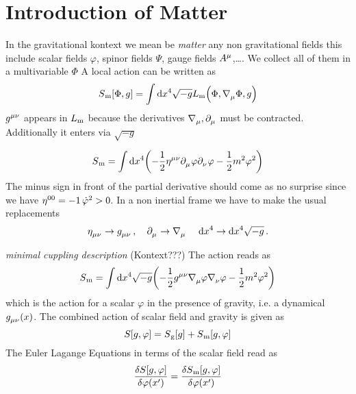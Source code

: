 \section{Introduction of Matter}
In the gravitational kontext we mean be \emph{matter} any non gravitational
fields this include scalar fields $\varphi$, spinor fields $\Psi$, gauge fields
$\tensor{A}{^\mu}$,\dots. We collect all of them in a multivariable $\Phi$
A local action can be written as 
\begin{equation}
S\textsubscript{m}[\Phi,g]=\int \dif x^4\sqrt{-g}
L\textsubscript{m}\left(\Phi,\tensor{\nabla}{_\mu}\Phi,g\right)
\end{equation}
$\tensor{g}{^\mu^\nu}$ appears in $L\textsubscript{m}$ because the derivatives
$\tensor{\nabla}{_\mu}, \tensor{\partial}{_\mu}$ must be contracted.
Additionally it enters via $\sqrt{-g}$
\begin{example}
\begin{equation}
S\textsubscript{m}=\int \dif x^4 \left(-\frac{1}{2}\tensor{\eta}{^\mu^\nu}
\tensor{\partial}{_\mu}\varphi\tensor{\partial}{_\nu}\varphi-\frac{1}{2}m^2\varphi^2\right)
\end{equation}
The minus sign in front of the partial derivative should come as no surprise
since we have $\tensor{\eta}{^0^0}=-1\, \dot{\varphi}^2>0$. In a non inertial
frame we have to make the usual replacements 
\begin{equation}
\tensor{\eta}{_\mu_\nu}\to \tensor{g}{_\mu_\nu}\, , \quad
\tensor{\partial}{_\mu}\to
\tensor{\nabla}{_\mu}\, \quad \dif x^4\to \dif x^4\sqrt{-g}\, .
\end{equation}
\end{example}
\emph{minimal cuppling description} (Kontext???) The action reads as 
\begin{equation}
S\textsubscript{m}=\int \dif x^4 \sqrt{-g}\left(-\frac{1}{2}\tensor{g}{^\mu^\nu}
\tensor{\nabla}{_\mu}\varphi\tensor{\nabla}{_\nu}\varphi-\frac{1}{2}m^2\varphi^2\right)
\end{equation}
which is the action for a scalar $\varphi$ in the presence of gravity, i.e. a
dynamical $\tensor{g}{_\mu_\nu}(x)$. The combined action of scalar field and
gravity is given as 
\begin{equation}
S[g,\varphi]=S\textsubscript{g}[g]+S\textsubscript{m}[g,\varphi]
\end{equation}
The Euler Lagange Equations in terms of the scalar field read as 
\begin{equation}
\frac{\delta S[g,\varphi]}{\delta
\varphi\left(x'\right)}=\frac{\delta S\textsubscript{m}[g,\varphi]}{\delta \varphi\left(x'\right)}
\end{equation}

